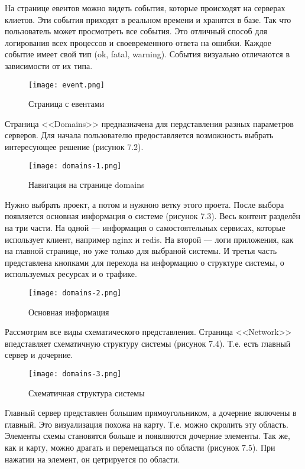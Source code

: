 На странице евентов можно видеть события, которые происходят на серверах клиетов. Эти события приходят в реальном времени и хранятся в базе. Так что пользователь может просмотреть все события. Это отличный способ для логирования всех процессов и своевременного ответа на ошибки. Каждое событие имеет свой тип (ok, fatal, warning). События визуально отличаются в зависимости от их типа. 

\begin{figure}[h!]
\centering
	\texttt{[image: event.png]}
	\caption{Страница с евентами}
	\clearpage
\end{figure}

Страница <<Domains>> предназначена для пердставления разных параметров серверов. Для начала пользователю предоставляется возможность выбрать интересующее решение (рисунок 7.2). \linebreak

\begin{figure}[h!]
\centering
	\texttt{[image: domains-1.png]}
	\caption{Навигация на странице domains}
	\clearpage
\end{figure}

Нужно выбрать проект, а потом и нужною ветку этого проета. После выбора появляется основная информация о системе (рисунок 7.3). Весь контент разделён на три части. На одной — информация о самостоятельных сервисах, которые использует клиент, например nginx и redis. На второй — логи приложения, как на главной странице, но уже только для выбраной системы. И третья часть представлена кнопками для перехода на информацию о структуре системы, о используемых ресурсах и о трафике.

\begin{figure}[h!]
\centering
	\texttt{[image: domains-2.png]}
	\caption{Основная информация}
	\clearpage
\end{figure}

Рассмотрим все виды схематического представления. Страница <<Network>> впедставляет схематичную структуру системы (рисунок 7.4). Т.е. есть главный сервер и дочерние. 

\begin{figure}[h!]
\centering
	\texttt{[image: domains-3.png]}
	\caption{Схематичная структура системы}
	\clearpage
\end{figure}

Главный сервер представлен большим прямоугольником, а дочерние включены в главный. Это визуализация похожа на карту. Т.е. можно скролить эту область. Элементы схемы становятся больше и появляются дочерние элементы. Так же, как и карту, можно драгать и перемещаться по области (рисунок 7.5). При нажатии на элемент, он цетрируется по области. 


